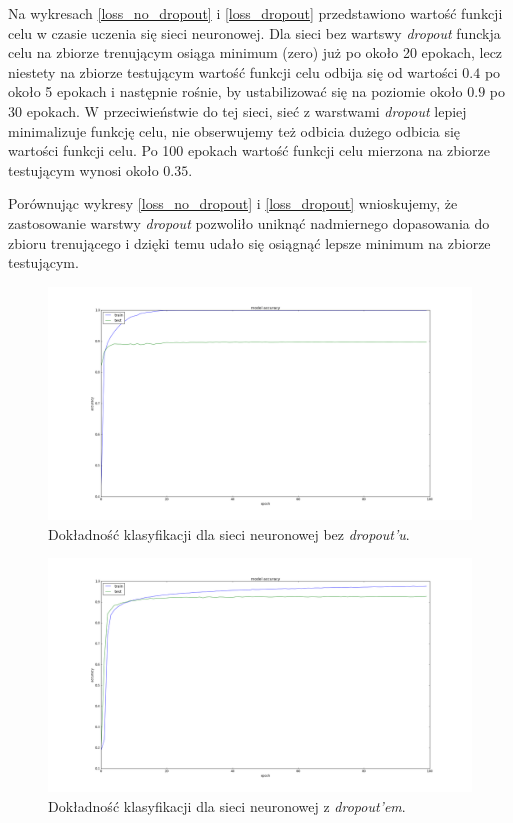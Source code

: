 \documentclass[12pt]{article}
\begin{document}
Na wykresach \ref{loss_no_dropout} i \ref{loss_dropout} przedstawiono wartość funkcji celu w czasie uczenia się sieci neuronowej. Dla sieci bez wartswy \textit{dropout} funckja celu na zbiorze trenującym osiąga minimum (zero) już po około 20 epokach, lecz niestety na zbiorze testującym wartość funkcji celu odbija się od wartości $0.4$ po około 5 epokach i następnie rośnie, by ustabilizować się na poziomie około $0.9$ po 30 epokach. W przeciwieństwie do tej sieci, sieć z warstwami \textit{dropout} lepiej minimalizuje funkcję celu, nie obserwujemy też odbicia dużego odbicia się wartości funkcji celu. Po 100 epokach wartość funkcji celu mierzona na zbiorze testującym wynosi około $0.35$.

Porównując wykresy \ref{loss_no_dropout} i \ref{loss_dropout} wnioskujemy, że zastosowanie warstwy \textit{dropout} pozwoliło uniknąć nadmiernego dopasowania do zbioru trenującego i dzięki temu udało się osiągnąć lepsze minimum na zbiorze testującym.


\begin{figure}[!ht]
\centering
\includegraphics[scale=0.25]{acc_no_dropout}
\caption{Dokładność klasyfikacji dla sieci neuronowej bez \textit{dropout'u}.}
\label{acc_no_dropout}
\end{figure}

\begin{figure}[!ht]
\centering
\includegraphics[scale=0.25]{acc_dropout}
\caption{Dokładność klasyfikacji dla sieci neuronowej z \textit{dropout'em}.}
\label{acc_dropout}
\end{figure}
\end{document}
